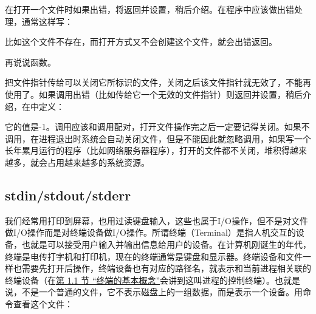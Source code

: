 在打开一个文件时如果出错，将返回并设置，稍后介绍。在程序中应该做出错处理，通常这样写：




比如这个文件不存在，而打开方式又不会创建这个文件，就会出错返回。



再说说函数。




把文件指针传给可以关闭它所标识的文件，关闭之后该文件指针就无效了，不能再使用了。如果调用出错（比如传给它一个无效的文件指针）则返回并设置，稍后介绍，在中定义：




它的值是-1。调用应该和调用配对，打开文件操作完之后一定要记得关闭。如果不调用，在进程退出时系统会自动关闭文件，但是不能因此就忽略调用，如果写一个长年累月运行的程序（比如网络服务器程序），打开的文件都不关闭，堆积得越来越多，就会占用越来越多的系统资源。


\subsection{stdin/stdout/stderr}
%


我们经常用打印到屏幕，也用过读键盘输入，这些也属于I/\BookSplit{}O操作，但不是对文件做I/\BookSplit{}O操作而是对终端设备做I/\BookSplit{}O操作。所谓终端（Terminal）是指人机交互的设备，也就是可以接受用户输入并输出信息给用户的设备。在计算机刚诞生的年代，终端是电传打字机和打印机，现在的终端通常是键盘和显示器。终端设备和文件一样也需要先打开后操作，终端设备也有对应的路径名，就表示和当前进程相关联的终端设备（在\hyperlink{db.ch34s01.id2890359}{第 1.\BookSplit{}1 节 “终端的基本概念”}会讲到这叫进程的控制终端）。也就是说，不是一个普通的文件，它不表示磁盘上的一组数据，而是表示一个设备。用命令查看这个文件：




